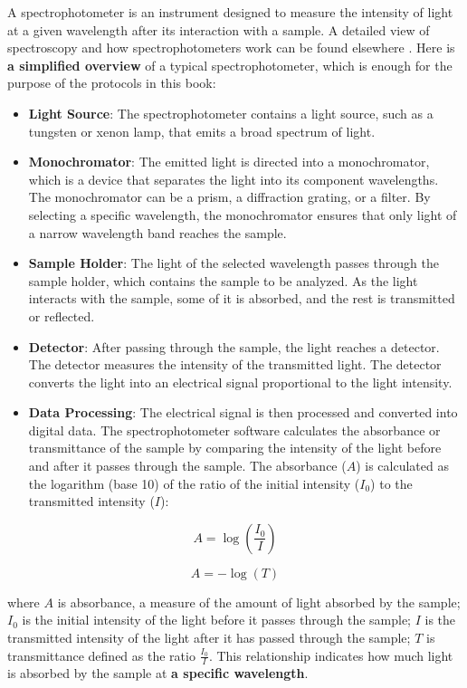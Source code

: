 \documentclass[
  9pt,
  american,
  a5paper,
  extrafontsizes,onecolumn,openright
  ]{memoir}
\begin{document}
A spectrophotometer is an instrument designed to measure the intensity of light at a given wavelength after its interaction with a sample. A detailed view of spectroscopy and how spectrophotometers work can be found elsewhere \autocite{skoog_fundamentals_2022}. Here is \textbf{a simplified overview} of a typical spectrophotometer, which is enough for the purpose of the protocols in this book:

\begin{itemize}
\item
  \textbf{Light Source}: The spectrophotometer contains a light source, such as a tungsten or xenon lamp, that emits a broad spectrum of light.
\item
  \textbf{Monochromator}: The emitted light is directed into a monochromator, which is a device that separates the light into its component wavelengths. The monochromator can be a prism, a diffraction grating, or a filter. By selecting a specific wavelength, the monochromator ensures that only light of a narrow wavelength band reaches the sample.
\item
  \textbf{Sample Holder}: The light of the selected wavelength passes through the sample holder, which contains the sample to be analyzed. As the light interacts with the sample, some of it is absorbed, and the rest is transmitted or reflected.
\item
  \textbf{Detector}: After passing through the sample, the light reaches a detector. The detector measures the intensity of the transmitted light. The detector converts the light into an electrical signal proportional to the light intensity.
\item
  \textbf{Data Processing}: The electrical signal is then processed and converted into digital data. The spectrophotometer software calculates the absorbance or transmittance of the sample by comparing the intensity of the light before and after it passes through the sample. The absorbance (\(A\)) is calculated as the logarithm (base 10) of the ratio of the initial intensity (\(I_0\)) to the transmitted intensity (\(I\)):
\end{itemize}

\[ A = \log\left(\frac{I_0}{I}\right) \]

\[ A = -\log(T) \]

where \(A\) is absorbance, a measure of the amount of light absorbed by the sample; \(I_0\) is the initial intensity of the light before it passes through the sample; \(I\) is the transmitted intensity of the light after it has passed through the sample; \(T\) is transmittance defined as the ratio \(\frac{I_0}{I}\). This relationship indicates how much light is absorbed by the sample at \textbf{a specific wavelength}.
\end{document}

